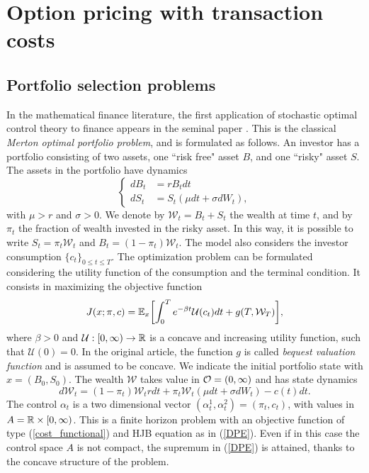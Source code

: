 

\chapter{Option pricing with transaction costs}\label{Chapter5}
\minitoc%

\vspace{5em}

\section{Portfolio selection problems}
In the mathematical finance literature, the first application of stochastic optimal control theory to finance appears in the seminal paper \cite{Me69}.
This is the classical \emph{Merton optimal portfolio problem}, and is formulated as follows. An investor has a portfolio consisting of two assets, one ``risk free" asset $B$,
and one ``risky" asset $S$. The assets in the portfolio have dynamics
\begin{equation}\label{Merton_problem1}
 \begin{cases}
 dB_t &=  rB_t dt \\
 dS_t &=  S_t \left( \mu dt + \sigma dW_t \right),
\end{cases}
\end{equation} 
with $\mu>r$ and $\sigma>0$. We denote by $\mathcal{W}_t = B_t + S_t$  the wealth at time $t$, and by $\pi_t$ the fraction of wealth invested in the risky asset. 
In this way, it is possible to write
$S_t = \pi_t \mathcal{W}_t$ and $B_t = (1-\pi_t) \mathcal{W}_t$. The model also considers the investor consumption $\{c_t\}_{0 \leq t \leq T}$. 
The optimization problem can be formulated considering the utility function of the consumption and the terminal condition. It consists in maximizing the objective function
\begin{equation}
 J(x;\pi,c) = \mathbb{E}_x \biggl[ \int_0^{T} e^{-\beta t} \mathcal{U}(c_t) dt + g(T,\mathcal{W}_T) \biggr],
\end{equation}
where $\beta > 0$ and $\mathcal{U}: [0,\infty) \to \mathbb{R}$ is a concave and increasing utility function, such that $\mathcal{U}(0)=0$.
In the original article, the function $g$ is called \emph{bequest valuation function} and is assumed to be concave.
We indicate the initial portfolio state with $x = (B_0,S_0)$. 
The wealth $\mathcal{W}$ takes value in $\mathcal{O} = (0,\infty)$ and has state dynamics
\begin{equation}
 d \mathcal{W}_t = (1-\pi_t) \mathcal{W}_t r dt + \pi_t \mathcal{W}_t (\mu dt + \sigma dW_t) - c(t)dt.
\end{equation}
The control $\alpha_t$ is a two dimensional vector $(\alpha^1_t,\alpha^2_t) = (\pi_t,c_t)$, with values in $A = \mathbb{R} \times [0,\infty)$. 
This is a finite horizon problem with an objective function of type (\ref{cost_functional})
and HJB equation as in (\ref{DPE}). 
Even if in this case the control space $A$ is not compact, the supremum in (\ref{DPE}) is attained, thanks to the concave structure of the problem.

